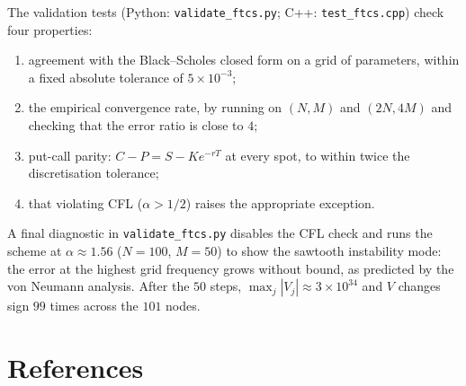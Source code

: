 \documentclass[11pt,a4paper]{article}
\begin{document}
The validation tests (Python: \texttt{validate\_ftcs.py}; C++:
\texttt{test\_ftcs.cpp}) check four properties:
\begin{enumerate}[leftmargin=2em]
\item agreement with the Black--Scholes closed form on a grid of
parameters, within a fixed absolute tolerance of $5 \times 10^{-3}$;
\item the empirical convergence rate, by running on $(N, M)$ and
$(2N, 4M)$ and checking that the error ratio is close to $4$;
\item put-call parity: $C - P = S - K e^{-rT}$ at every spot, to
within twice the discretisation tolerance;
\item that violating CFL ($\alpha > 1/2$) raises the appropriate
exception.
\end{enumerate}

A final diagnostic in \texttt{validate\_ftcs.py} disables the CFL check
and runs the scheme at $\alpha \approx 1.56$ ($N = 100$, $M = 50$) to
show the sawtooth instability mode: the error at the highest grid
frequency grows without bound, as predicted by the von Neumann analysis.
After the $50$ steps, $\max_j |V_j| \approx 3 \times 10^{34}$ and $V$
changes sign $99$ times across the $101$ nodes.

\section*{References}
\end{document}
